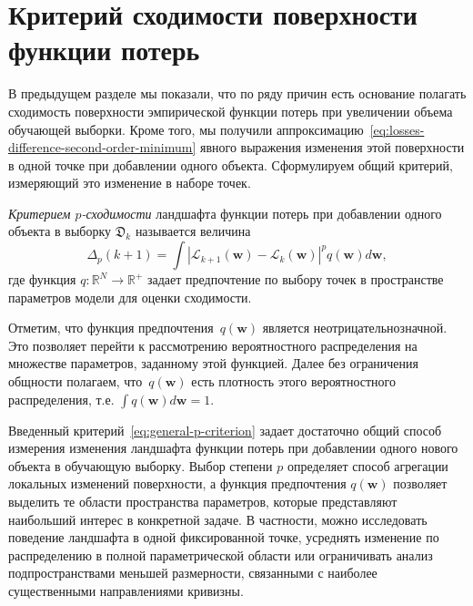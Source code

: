 \section{Критерий сходимости поверхности функции потерь}

В предыдущем разделе мы показали, что по ряду причин есть основание полагать сходимость поверхности эмпирической функции потерь при увеличении объема обучающей выборки. Кроме того, мы получили аппроксимацию~\eqref{eq:losses-difference-second-order-minimum} явного выражения изменения этой поверхности в одной точке при добавлении одного объекта. Сформулируем общий критерий, измеряющий это изменение в наборе точек.

\begin{definition}
    \emph{Критерием $p$-сходимости} ландшафта функции потерь при добавлении одного объекта в выборку $\mathfrak{D}_{k}$ называется величина
    \begin{equation}
        \label{eq:general-p-criterion}
        \Delta_{p}(k+1) = \int \left| \mathcal{L}_{k+1}(\mathbf{w}) - \mathcal{L}_{k}(\mathbf{w}) \right|^{p} q(\mathbf{w}) d\mathbf{w},
    \end{equation}
    где функция $q: \mathbb{R}^{N} \to \mathbb{R}^{+}$ задает предпочтение по выбору точек в пространстве параметров модели для оценки сходимости.
\end{definition}

\begin{remark}
    Отметим, что функция предпочтения~$q(\mathbf{w})$ является неотрицательнозначной. Это позволяет перейти к рассмотрению вероятностного распределения на множестве параметров, заданному этой функцией. Далее без ограничения общности полагаем, что~$q(\mathbf{w})$ есть плотность этого вероятностного распределения, т.\:е. $\int q(\mathbf{w}) d\mathbf{w} = 1$.
\end{remark}

Введенный критерий~\eqref{eq:general-p-criterion} задает достаточно общий способ измерения изменения ландшафта функции потерь при добавлении одного нового объекта в обучающую выборку. Выбор степени $p$ определяет способ агрегации локальных изменений поверхности, а функция предпочтения $q(\mathbf w)$ позволяет выделить те области пространства параметров, которые представляют наибольший интерес в конкретной задаче. В частности, можно исследовать поведение ландшафта в одной фиксированной точке, усреднять изменение по распределению в полной параметрической области или ограничивать анализ подпространствами меньшей размерности, связанными с наиболее существенными направлениями кривизны.


